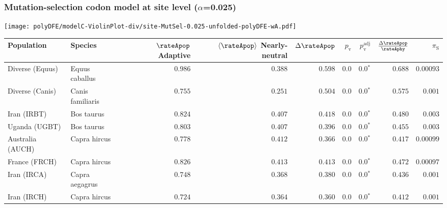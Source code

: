 \subsubsection*{Mutation-selection codon model at site level ($\alpha$=0.025)}
\begin{center}
    \texttt{[image: polyDFE/modelC-ViolinPlot-div/site-MutSel-0.025-unfolded-polyDFE-wA.pdf]}
    \begin{adjustbox}{width = 1\textwidth}
        \begin{tabular}{|l|l|r|r|r|r|r|r|r|}
            \toprule
            Population & Species & \specialcell{$\rateApop$ \\ Adaptive}                & \specialcell{$\left< \rateApop \right>$ \\ Nearly-neutral}                & $\Delta \rateApop $    & $p_{\mathrm{v}}$ & $p_{\mathrm{v}}^{\mathrm{adj}}$ & $\frac{\Delta\rateApop}{\rateAphy}$ & $\pi_{\textrm{S}}$    \\
            \midrule
            Diverse (Equus)                    & Equus caballus          & $ 0.986$ & $ 0.388$ & $ 0.598$ & $0.0$    & $\bm{0.0{^*}}$ & $ 0.688$ & $0.00093$  \\
            Diverse (Canis)                  & Canis familiaris          & $ 0.755$ & $ 0.251$ & $ 0.504$ & $0.0$    & $\bm{0.0{^*}}$ & $ 0.575$ & $ 0.001$ \\
            Iran (IRBT)               & Bos taurus        & $ 0.824$ & $ 0.407$ & $ 0.418$ & $0.0$    & $\bm{0.0{^*}}$ & $ 0.480$ & $ 0.003$ \\
            Uganda (UGBT)                  & Bos taurus        & $ 0.803$ & $ 0.407$ & $ 0.396$ & $0.0$    & $\bm{0.0{^*}}$ & $ 0.455$ & $ 0.003$ \\
            Australia (AUCH)                    & Capra hircus      & $ 0.778$ & $ 0.412$ & $ 0.366$ & $0.0$    & $\bm{0.0{^*}}$ & $ 0.417$ & $0.00099$ \\
            France (FRCH)                    & Capra hircus        & $ 0.826$ & $ 0.413$ & $ 0.413$ & $0.0$    & $\bm{0.0{^*}}$ & $ 0.472$ & $0.00097$ \\
            Iran (IRCA)                   & Capra aegagrus        & $ 0.748$ & $ 0.368$ & $ 0.380$ & $0.0$    & $\bm{0.0{^*}}$ & $ 0.436$ & $ 0.001$ \\
            Iran (IRCH)                 & Capra hircus        & $ 0.724$ & $ 0.364$ & $ 0.360$ & $0.0$    & $\bm{0.0{^*}}$ & $ 0.412$ & $ 0.001$ \\

\end{tabular}
\end{adjustbox}
\end{center}
